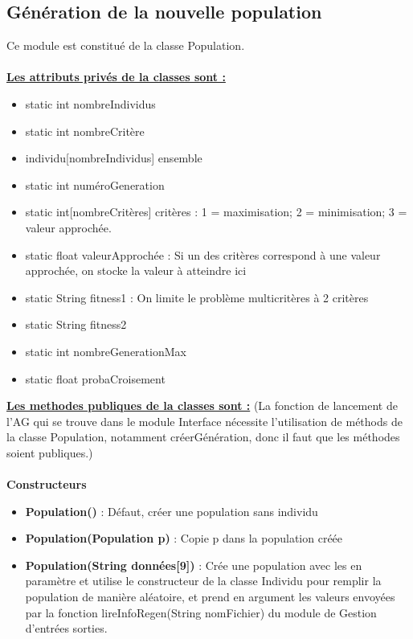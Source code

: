 \documentclass[a4paper,11pt]{article}
\begin{document}
		\subsection{Génération de la nouvelle population}
			Ce module est constitué de la classe Population.\\
			\\
			\underline{\bf Les attributs privés de la classes sont :}\\
				\begin{itemize}
				\item static int nombreIndividus
				\item static int nombreCritère
				\item individu[nombreIndividus] ensemble
				\item static int numéroGeneration
				\item static int[nombreCritères] critères : 1  = maximisation; 2 = minimisation; 3 = valeur approchée.
				\item static float valeurApprochée : Si un des critères correspond à une valeur approchée, on stocke la valeur à atteindre ici
				\item static String fitness1 : On limite le problème multicritères à 2 critères
				\item static String fitness2
				\item static int nombreGenerationMax
				\item static float probaCroisement\\
			\end{itemize}
			\underline{\bf Les methodes publiques de la classes sont :} (La fonction de lancement de l'AG qui se trouve dans le module Interface nécessite l'utilisation de méthods de la classe Population, notamment créerGénération, donc il faut que les méthodes soient publiques.)\\\\
			\textbf{Constructeurs}
						\begin{itemize}
							\item \textbf{Population()} : Défaut, créer une population sans individu
							\item \textbf{Population(Population p)} : Copie p dans la population créée
							\item \textbf{Population(String données[9])} : Crée une population avec les en paramètre et utilise le constructeur de la classe Individu pour remplir la population de manière aléatoire, et prend en argument les valeurs envoyées par la fonction lireInfoRegen(String nomFichier) du module de Gestion d'entrées sorties.\\
						\end{itemize}
\end{document}
